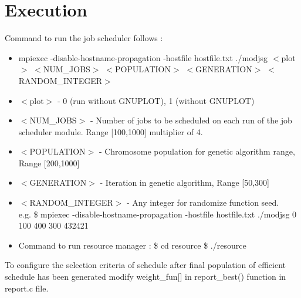 \section{Execution}
Command to run the job scheduler follows :
\begin{itemize}
 \item mpiexec  -disable-hostname-propagation -hostfile hostfile.txt ./modjsg $<$plot$>$ $<$NUM\_JOBS$>$ $<$POPULATION$>$ $<$GENERATION$>$ $<$RANDOM\_INTEGER$>$
\item $<$plot$>$  - 0 (run without GNUPLOT), 1 (without GNUPLOT)
\item $<$NUM\_JOBS$>$ - Number of jobs to be scheduled on each run of the job scheduler module. Range [100,1000] multiplier of 4.
\item $<$POPULATION$>$ - Chromosome population for genetic algorithm range, Range [200,1000]
 \item $<$GENERATION$>$ - Iteration in genetic algorithm, Range [50,300]
\item $<$RANDOM\_INTEGER$>$ - Any integer for randomize function seed.\\
e.g. \$ mpiexec  -disable-hostname-propagation -hostfile hostfile.txt ./modjsg 0 100 400 300 432421 \\
\item Command to run resource manager : 
\subitem \$ cd resource 
\subitem \$ ./resource 
\end{itemize}

To configure the selection criteria of schedule after final population of efficient schedule has been generated modify weight\_fun[] in report\_best() function in report.c file.
